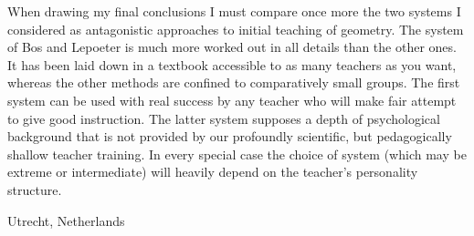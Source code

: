 When drawing my final conclusions I must compare once more the two systems I considered as antagonistic approaches to initial teaching of geometry. The system of Bos and Lepoeter is much more worked out in all details than the other ones. It has been laid down in a textbook accessible to as many teachers as you want, whereas the other methods are confined to comparatively small groups. The first system can be used with real success by any teacher who will make fair attempt to give good instruction. The latter system supposes a depth of psychological background that is not provided by our profoundly scientific, but pedagogically shallow teacher training. In every special case the choice of system (which may be extreme or intermediate) will heavily depend on the teacher's personality structure.

\bigskip
\medskip

{\fontsize{9pt}{11pt}\selectfont Utrecht, Netherlands}\relax



